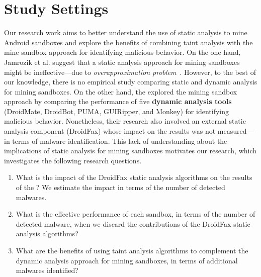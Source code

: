 \section{Study Settings}


Our research work aims to better understand
the use of static analysis to mine Android sandboxes
and explore the benefits of combining taint analysis
with the mine sandbox approach for identifying malicious
behavior. 
On the one hand, Jamrozik et al. suggest that a 
static analysis approach for mining sandboxes
might be ineffective---due to \emph{overapproximation
problem}~\cite{DBLP:conf/icse/JamrozikSZ16The}.
However, to the best of our knowledge,
there is no empirical study comparing
static and dynamic analysis for mining sandboxes.
On the other hand, the \blls explored the mining sandbox approach by comparing
the performance of five {\bf dynamic analysis tools} (DroidMate, DroidBot, PUMA,
GUIRipper, and Monkey) for identifying
malicious behavior. Nonetheless, their
research also involved an external static analysis component (DroidFax)
whose impact on the results was not measured---in terms of malware
identification. 
This lack of understanding about the implications of
static analysis for mining sandboxes motivates
our research, which investigates the following research questions.

\begin{enumerate}[(RQ1)]

\item What is the impact of the DroidFax static analysis algorithms on the results of the \blls?
  We estimate the impact in terms of the number of detected malwares. 
  
  
 \item What is the effective performance of each sandbox, in terms of the number of detected malware, when we
   discard the contributions of the DroidFax static analysis algorithms?

 \item What are the benefits of using taint
   analysis algorithms to complement the dynamic analysis approach for mining sandboxes,
   in terms of additional malwares identified?
\end{enumerate}

